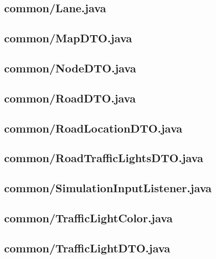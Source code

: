 \subsection{common/Lane.java}

\newpage
\subsection{common/MapDTO.java}

\newpage
\subsection{common/NodeDTO.java}

\newpage
\subsection{common/RoadDTO.java}

\newpage
\subsection{common/RoadLocationDTO.java}

\newpage
\subsection{common/RoadTrafficLightsDTO.java}

\newpage
\subsection{common/SimulationInputListener.java}

\newpage
\subsection{common/TrafficLightColor.java}

\newpage
\subsection{common/TrafficLightDTO.java}

\newpage
